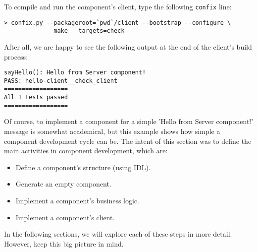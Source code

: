 \noindent
To compile and run the component's client, type the following {\tt confix}
line: 
\begin{small}
\begin{verbatim}
> confix.py --packageroot=`pwd`/client --bootstrap --configure \
            --make --targets=check
\end{verbatim}
\end{small}

\noindent
After all, we are happy to see the following output at the end of the client's
build process:

\begin{small}
\begin{verbatim}
sayHello(): Hello from Server component!
PASS: hello-client__check_client
==================
All 1 tests passed
==================
\end{verbatim}
\end{small}


\noindent
Of course, to implement a component for a simple 'Hello from Server component!'
message is somewhat academical, but this example shows how simple a component
development cycle can be. 
The intent of this section was to define the main activities in component 
development, which are:
\begin{itemize}
\item Define a component's structure (using IDL).
\item Generate an empty component.
\item Implement a component's business logic. 
\item Implement a component's client.
\end{itemize}

\noindent
In the following sections, we will explore each of these steps in more
detail. However, keep this big picture in mind. 

